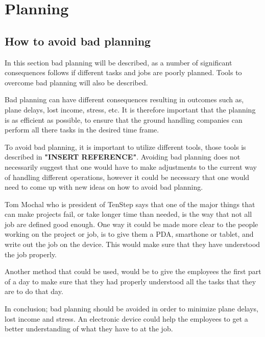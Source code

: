 \chapter{Planning}
\section{How to avoid bad planning}
In this section bad planning will be described, as a number of significant consequences follows if different tasks and jobs are poorly planned. Tools to overcome bad planning will also be described.

Bad planning can have different consequences resulting in outcomes such as, plane delays, lost income, stress, etc. It is therefore important that the planning is as efficient as possible, to ensure that the ground handling companies can perform all there tasks in the desired time frame.

To avoid bad planning, it is important to utilize different tools, those  tools is described in \textbf{"INSERT REFERENCE"}. Avoiding bad planning does not necessarily suggest that one would have to make adjustments to the current way of handling different operations, however it could be necessary that one would need to come up with new ideas on how to avoid bad planning.

Tom Mochal who is president of TenStep\cite{AvoidP_TenStep} says that one of the major things that can make projects fail, or take longer time than needed, is the way that not all job are defined good enough\cite{AvoidP_PoorP}. One way it could be made more clear to the people working on the project or job, is to give them a PDA, smarthone or tablet, and write out the job on the device. This would make sure that they have understood the job properly.


Another method that could be used, would be to give the employees the first part of a day to make sure that they had properly understood all the tasks that they are to do that day.

In conclusion; bad planning should be avoided in order to minimize plane delays, lost income and stress. An electronic device could help the employees to get a better understanding of what they have to at the job. 